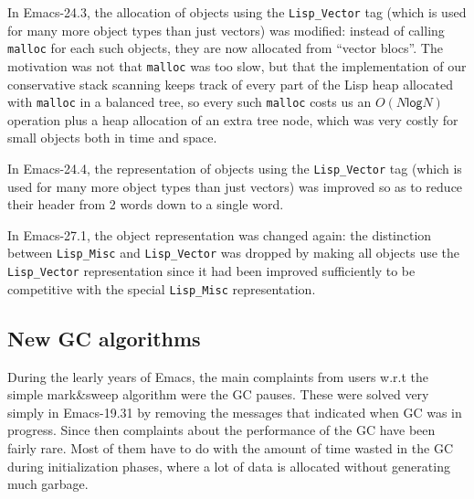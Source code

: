 \documentclass[format=acmsmall, review=false, screen=true]{acmart}
\begin{document}

In Emacs-24.3, the allocation of objects using the \texttt{Lisp\_Vector} tag
(which is used for many more object types than just vectors) was modified:
instead of calling \texttt{malloc} for each such objects, they are now
allocated from ``vector blocs''.  The motivation was not that
\texttt{malloc} was too slow, but that the implementation of our
conservative stack scanning keeps track of every part of the Lisp heap
allocated with \texttt{malloc} in a balanced tree, so every such
\texttt{malloc} costs us an $O(N \textsf{log} N)$ operation plus a heap
allocation of an extra tree node, which was very costly for small objects
both in time and space.

In Emacs-24.4, the representation of objects using the \texttt{Lisp\_Vector}
tag (which is used for many more object types than just vectors) was
improved so as to reduce their header from 2 words down to a single word.

In Emacs-27.1, the object representation was changed again: the distinction
between \texttt{Lisp\_Misc} and \texttt{Lisp\_Vector} was dropped by making
all objects use the \texttt{Lisp\_Vector} representation since it had been
improved sufficiently to be competitive with the special
\texttt{Lisp\_Misc} representation.


\subsection{New GC algorithms}
\label{sec:gc-algorithms}

During the learly years of Emacs, the main complaints from users w.r.t the
simple mark\&sweep algorithm were the GC pauses.  These were solved very
simply in Emacs-19.31 by removing the messages that indicated when GC was in
progress.  Since then complaints about the performance of the GC have been
fairly rare.  Most of them have to do with the amount of time wasted in the
GC during initialization phases, where a lot of data is allocated without
generating much garbage.
\end{document}
